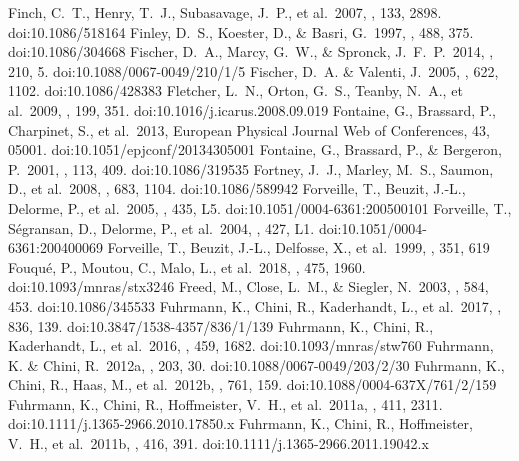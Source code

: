 \documentclass[twocolumn,tighten,twocolappendix]{aastex631}
\begin{document}
\begin{thebibliography}{}
 Finch, C.~T., Henry, T.~J., Subasavage, J.~P., et al.\ 2007, \aj, 133, 2898. doi:10.1086/518164
 Finley, D.~S., Koester, D., \& Basri, G.\ 1997, \apj, 488, 375. doi:10.1086/304668
 Fischer, D.~A., Marcy, G.~W., \& Spronck, J.~F.~P.\ 2014, \apjs, 210, 5. doi:10.1088/0067-0049/210/1/5
 Fischer, D.~A. \& Valenti, J.\ 2005, \apj, 622, 1102. doi:10.1086/428383
 Fletcher, L.~N., Orton, G.~S., Teanby, N.~A., et al.\ 2009, \icarus, 199, 351. doi:10.1016/j.icarus.2008.09.019
 Fontaine, G., Brassard, P., Charpinet, S., et al.\ 2013, European Physical Journal Web of Conferences, 43, 05001. doi:10.1051/epjconf/20134305001
 Fontaine, G., Brassard, P., \& Bergeron, P.\ 2001, \pasp, 113, 409. doi:10.1086/319535
 Fortney, J.~J., Marley, M.~S., Saumon, D., et al.\ 2008, \apj, 683, 1104. doi:10.1086/589942
 Forveille, T., Beuzit, J.-L., Delorme, P., et al.\ 2005, \aap, 435, L5. doi:10.1051/0004-6361:200500101
 Forveille, T., S{\'e}gransan, D., Delorme, P., et al.\ 2004, \aap, 427, L1. doi:10.1051/0004-6361:200400069
 Forveille, T., Beuzit, J.-L., Delfosse, X., et al.\ 1999, \aap, 351, 619
 Fouqu{\'e}, P., Moutou, C., Malo, L., et al.\ 2018, \mnras, 475, 1960. doi:10.1093/mnras/stx3246
 Freed, M., Close, L.~M., \& Siegler, N.\ 2003, \apj, 584, 453. doi:10.1086/345533
 Fuhrmann, K., Chini, R., Kaderhandt, L., et al.\ 2017, \apj, 836, 139. doi:10.3847/1538-4357/836/1/139
 Fuhrmann, K., Chini, R., Kaderhandt, L., et al.\ 2016, \mnras, 459, 1682. doi:10.1093/mnras/stw760
 Fuhrmann, K. \& Chini, R.\ 2012a, \apjs, 203, 30. doi:10.1088/0067-0049/203/2/30
 Fuhrmann, K., Chini, R., Haas, M., et al.\ 2012b, \apj, 761, 159. doi:10.1088/0004-637X/761/2/159
 Fuhrmann, K., Chini, R., Hoffmeister, V.~H., et al.\ 2011a, \mnras, 411, 2311. doi:10.1111/j.1365-2966.2010.17850.x
 Fuhrmann, K., Chini, R., Hoffmeister, V.~H., et al.\ 2011b, \mnras, 416, 391. doi:10.1111/j.1365-2966.2011.19042.x

\end{thebibliography}
\end{document}
